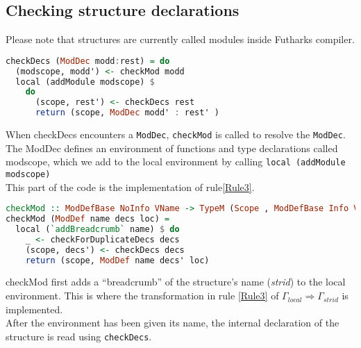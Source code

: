 \subsection{Checking structure declarations}
Please note that structures are currently called modules inside Futharks compiler.
\begin{lstlisting}[language=Haskell]
checkDecs (ModDec modd:rest) = do
  (modscope, modd') <- checkMod modd
  local (addModule modscope) $
    do
      (scope, rest') <- checkDecs rest
      return (scope, ModDec modd' : rest' )
\end{lstlisting}
When checkDecs encounters a \texttt{ModDec}, \texttt{checkMod} is called to resolve the \texttt{ModDec}.
The ModDec defines an environment of functions and type declarations called
modscope, which we add to the local environment by calling \texttt{local
  (addModule modscope)}\\
This part of the code is the implementation of rule\ref{Rule3}.
\begin{lstlisting}[language=Haskell]
checkMod :: ModDefBase NoInfo VName -> TypeM (Scope , ModDefBase Info VName)
checkMod (ModDef name decs loc) =
  local (`addBreadcrumb` name) $ do
    _ <- checkForDuplicateDecs decs
    (scope, decs') <- checkDecs decs
    return (scope, ModDef name decs' loc)
\end{lstlisting}
checkMod first adds a ``breadcrumb'' of the structure's name (\textit{strid}) to
the local environment. This is where the transformation in rule \ref{Rule3} of
$\Gamma_{local} \Rightarrow \Gamma_{strid}$ is implemented.
\\
After the environment has been given its name, the internal declaration of the
structure is read using \texttt{checkDecs}.
\\
